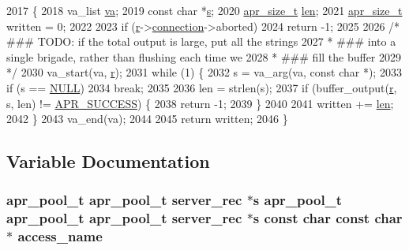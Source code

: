 \begin{DoxyCode}
2017 \{
2018     va\_list \hyperlink{group__APR__Util__Bucket__Brigades_gafa1ac2f9aa9e56e3f87cbc5324a3114f}{va};
2019     \textcolor{keyword}{const} \textcolor{keywordtype}{char} *\hyperlink{group__APACHE__CORE__LISTEN_ga9359ed159c8b295541e3770172d34550}{s};
2020     \hyperlink{group__apr__platform_gaaa72b2253f6f3032cefea5712a27540e}{apr\_size\_t} \hyperlink{group__APACHE__CORE__LOG_gab5a43233d60ef05c5b5bf5cba3d74468}{len};
2021     \hyperlink{group__apr__platform_gaaa72b2253f6f3032cefea5712a27540e}{apr\_size\_t} written = 0;
2022 
2023     \textcolor{keywordflow}{if} (\hyperlink{group__APACHE__CORE__CONFIG_ga091cdd45984e865a888a4f8bb8fe107a}{r}->\hyperlink{structrequest__rec_a0924aae55826638314f76952ca5d60b1}{connection}->aborted)
2024         \textcolor{keywordflow}{return} -1;
2025 
2026     \textcolor{comment}{/* ### TODO: if the total output is large, put all the strings}
2027 \textcolor{comment}{     * ### into a single brigade, rather than flushing each time we}
2028 \textcolor{comment}{     * ### fill the buffer}
2029 \textcolor{comment}{     */}
2030     va\_start(va, \hyperlink{group__APACHE__CORE__CONFIG_ga091cdd45984e865a888a4f8bb8fe107a}{r});
2031     \textcolor{keywordflow}{while} (1) \{
2032         s = va\_arg(va, \textcolor{keyword}{const} \textcolor{keywordtype}{char} *);
2033         \textcolor{keywordflow}{if} (s == \hyperlink{pcre_8txt_ad7f989d16aa8ca809a36bc392c07fba1}{NULL})
2034             \textcolor{keywordflow}{break};
2035 
2036         len = strlen(s);
2037         \textcolor{keywordflow}{if} (buffer\_output(\hyperlink{group__APACHE__CORE__CONFIG_ga091cdd45984e865a888a4f8bb8fe107a}{r}, s, len) != \hyperlink{group__apr__errno_ga9ee311b7bf1c691dc521d721339ee2a6}{APR\_SUCCESS}) \{
2038             \textcolor{keywordflow}{return} -1;
2039         \}
2040 
2041         written += \hyperlink{group__APACHE__CORE__LOG_gab5a43233d60ef05c5b5bf5cba3d74468}{len};
2042     \}
2043     va\_end(va);
2044 
2045     \textcolor{keywordflow}{return} written;
2046 \}
\end{DoxyCode}


\subsection{Variable Documentation}
\subsubsection[{\texorpdfstring{access\+\_\+name}{access_name}}]{ {\bf apr\+\_\+pool\+\_\+t} {\bf apr\+\_\+pool\+\_\+t} {\bf server\+\_\+rec} $\ast${\bf s} {\bf apr\+\_\+pool\+\_\+t} {\bf apr\+\_\+pool\+\_\+t} {\bf apr\+\_\+pool\+\_\+t} {\bf server\+\_\+rec} $\ast${\bf s} const char const char $\ast$ access\+\_\+name}\hypertarget{group__APACHE__CORE__CONFIG_gafa31c3d88dbb28bba9163c1ebcaab7a8}{}\label{group__APACHE__CORE__CONFIG_gafa31c3d88dbb28bba9163c1ebcaab7a8}
